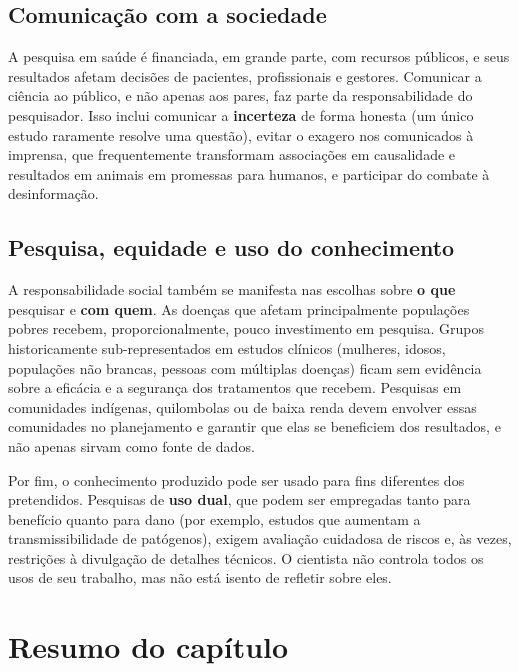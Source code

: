 \documentclass[
]{book}
\begin{document}
\subsection{Comunicação com a sociedade}\label{comunicauxe7uxe3o-com-a-sociedade}

A pesquisa em saúde é financiada, em grande parte, com recursos públicos, e seus resultados afetam decisões de pacientes, profissionais e gestores. Comunicar a ciência ao público, e não apenas aos pares, faz parte da responsabilidade do pesquisador. Isso inclui comunicar a \textbf{incerteza} de forma honesta (um único estudo raramente resolve uma questão), evitar o exagero nos comunicados à imprensa, que frequentemente transformam associações em causalidade e resultados em animais em promessas para humanos, e participar do combate à desinformação.

\subsection{Pesquisa, equidade e uso do conhecimento}\label{pesquisa-equidade-e-uso-do-conhecimento}

A responsabilidade social também se manifesta nas escolhas sobre \textbf{o que} pesquisar e \textbf{com quem}. As doenças que afetam principalmente populações pobres recebem, proporcionalmente, pouco investimento em pesquisa. Grupos historicamente sub-representados em estudos clínicos (mulheres, idosos, populações não brancas, pessoas com múltiplas doenças) ficam sem evidência sobre a eficácia e a segurança dos tratamentos que recebem. Pesquisas em comunidades indígenas, quilombolas ou de baixa renda devem envolver essas comunidades no planejamento e garantir que elas se beneficiem dos resultados, e não apenas sirvam como fonte de dados.

Por fim, o conhecimento produzido pode ser usado para fins diferentes dos pretendidos. Pesquisas de \textbf{uso dual}, que podem ser empregadas tanto para benefício quanto para dano (por exemplo, estudos que aumentam a transmissibilidade de patógenos), exigem avaliação cuidadosa de riscos e, às vezes, restrições à divulgação de detalhes técnicos. O cientista não controla todos os usos de seu trabalho, mas não está isento de refletir sobre eles.

\section{Resumo do capítulo}\label{resumo-do-capuxedtulo-7}
\end{document}
